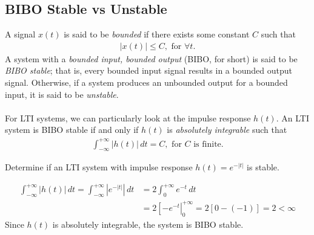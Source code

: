 \documentclass{report}
\begin{document}
\subsection{BIBO Stable vs Unstable}
A signal $x(t)$ is said to be \emph{bounded} if there exists some constant $C$ such that 
\begin{align}
    |x(t)| \leq C, \text{ for } \forall t.
\end{align}
A system with a \emph{bounded input, bounded output} (BIBO, for short) is said to be \emph{BIBO stable}; that is, every bounded input signal results in a bounded output signal. Otherwise, if a system 
produces an unbounded output for a bounded input, it is said to be \emph{unstable}.
\\ \\
For LTI systems, we can particularly look at the impulse response $h(t)$. An LTI system is BIBO stable if and only if $h(t)$ is \emph{absolutely integrable} such that
\begin{align}
    \int_{-\infty}^{+\infty} |h(t)| \,dt = C, \text{ for $C$ is finite.}
\end{align}

\begin{example}
    Determine if an LTI system with impulse response $h(t)=e^{-|t|}$ is stable.
\end{example}
\begin{solution}
    \begin{align*}
        \int_{-\infty}^{+\infty} |h(t)| \,dt = \int_{-\infty}^{+\infty} |e^{-|t|}| \,dt &= 2\int_{0}^{+\infty} e^{-t} \,dt \\
        &= 2 \left[-e^{-t}\right|_0^{+\infty} = 2 [0 - (-1)] = 2 < \infty
    \end{align*}
    Since $h(t)$ is absolutely integrable, the system is BIBO stable.
\end{solution}
\end{document}
